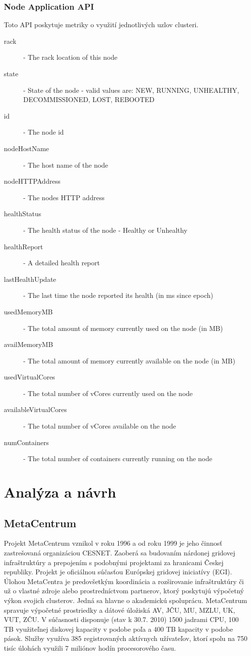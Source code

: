 \documentclass[11pt,final,oneside]{fithesis}
\begin{document}
\subsection{Node Application API}
Toto API poskytuje metriky o využití jednotlivých uzlov clusteri.
\begin{description}
\item[rack] - The rack location of this node
\item[state] - State of the node - valid values are: NEW, RUNNING, UNHEALTHY, DECOMMISSIONED, LOST, REBOOTED
\item[id] - The node id
\item[nodeHostName] - The host name of the node
\item[nodeHTTPAddress] - The nodes HTTP address
\item[healthStatus] - The health status of the node - Healthy or Unhealthy
\item[healthReport] - A detailed health report
\item[lastHealthUpdate] - The last time the node reported its health (in ms since epoch)
\item[usedMemoryMB] - The total amount of memory currently used on the node (in MB)
\item[availMemoryMB] - The total amount of memory currently available on the node (in MB)
\item[usedVirtualCores] - The total number of vCores currently used on the node
\item[availableVirtualCores] - The total number of vCores available on the node
\item[numContainers] - The total number of containers currently running on the node
\end{description}

\chapter{Analýza a návrh}
\section{MetaCentrum}
Projekt MetaCentrum vznikol v roku 1996 a od roku 1999 je jeho činnosť zastrešovaná organizáciou CESNET. Zaoberá sa budovaním nárdonej gridovej infraštruktúry a prepojením s podobnými projektami za hranicami
Českej republiky. Projekt je oficiálnou súčasťou Európskej gridovej iniciatívy (EGI). Úlohou MetaCentra je predovšetkým koordinácia a rozširovanie infraštruktúry či už o vlastné zdroje alebo prostredníctvom
partnerov, ktorý poskytujú výpočetný výkon svojich clusterov. Jedná sa hlavne o akademickú spoluprácu. MetaCentrum spravuje výpočetné prostriedky a dátové úložiská AV, JČU, MU, MZLU, UK, VUT, ZČU.
V súčasnosti disponuje (stav k 30.7. 2010) 1500 jadrami CPU, 100 TB využiteľnej diskovej kapacity v podobe poľa a 400 TB kapacity v podobe pások. Služby využíva 385 registrovaných aktívnych užívateľov, ktorí 
spolu na 750 tisíc úlohách využili 7 miliónov hodín procesorového času.
\end{document}

